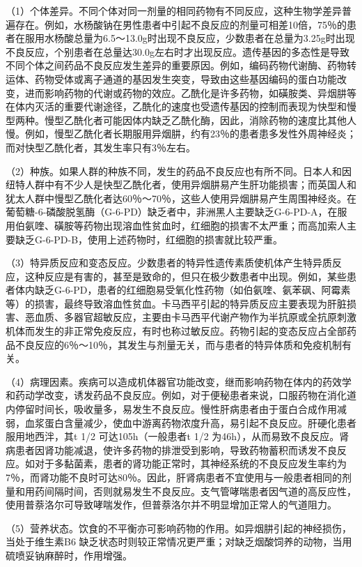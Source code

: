 （1）个体差异。不同个体对同一剂量的相同药物有不同反应，这种生物学差异普遍存在。例如，水杨酸钠在男性患者中引起不良反应的剂量可相差10倍，75％的患者在服用水杨酸总量为6.5～13.0g时出现不良反应，少数患者在总量为3.25g时出现不良反应，个别患者在总量达30.0g左右时才出现反应。遗传基因的多态性是导致不同个体之间药品不良反应发生差异的重要原因。例如，编码药物代谢酶、药物转运体、药物受体或离子通道的基因发生突变，导致由这些基因编码的蛋白功能改变，进而影响药物的代谢或药物的效应。乙酰化是许多药物，如磺胺类、异烟肼等在体内灭活的重要代谢途径，乙酰化的速度也受遗传基因的控制而表现为快型和慢型两种。慢型乙酰化者可能因体内缺乏乙酰化酶，因此，消除药物的速度比其他人慢。例如，慢型乙酰化者长期服用异烟肼，约有23％的患者患多发性外周神经炎；而对快型乙酰化者，其发生率只有3％左右。

（2）种族。如果人群的种族不同，发生的药品不良反应也有所不同。日本人和因纽特人群中有不少人是快型乙酰化者，使用异烟肼易产生肝功能损害；而英国人和犹太人群中慢型乙酰化者达60％～70％，这些人使用异烟肼易产生周围神经炎。在葡萄糖-6-磷酸脱氢酶（G-6-PD）缺乏者中，非洲黑人主要缺乏G-6-PD-A，在服用伯氨喹、磺胺等药物出现溶血性贫血时，红细胞的损害不太严重；而高加索人主要缺乏G-6-PD-B，使用上述药物时，红细胞的损害就比较严重。

（3）特异质反应和变态反应。少数患者的特异性遗传素质使机体产生特异质反应，这种反应是有害的，甚至是致命的，但只在极少数患者中出现。例如，某些患者体内缺乏G-6-PD，患者的红细胞易受氧化性药物（如伯氨喹、氨苯砜、阿霉素等）的损害，最终导致溶血性贫血。卡马西平引起的特异质反应主要表现为肝脏损害、恶血质、多器官超敏反应，主要由卡马西平代谢产物作为半抗原或全抗原刺激机体而发生的非正常免疫反应，有时也称过敏反应。药物引起的变态反应占全部药品不良反应的6％～10％，其发生与剂量无关，而与患者的特异体质和免疫机制有关。

（4）病理因素。疾病可以造成机体器官功能改变，继而影响药物在体内的药效学和药动学改变，诱发药品不良反应。例如，对于便秘患者来说，口服药物在消化道内停留时间长，吸收量多，易发生不良反应。慢性肝病患者由于蛋白合成作用减弱，血浆蛋白含量减少，使血中游离药物浓度升高，易引起不良反应。肝硬化患者服用地西泮，其{t}
{1/2} 可达105h（一般患者{t} {1/2}
为46h），从而易致不良反应。肾病患者因肾功能减退，使许多药物的排泄受到影响，导致药物蓄积而诱发不良反应。如对于多黏菌素，患者的肾功能正常时，其神经系统的不良反应发生率约为7％，而肾功能不良时可达80％。因此，肝肾病患者不宜使用与一般患者相同的剂量和用药间隔时间，否则就易发生不良反应。支气管哮喘患者因气道的高反应性，使用普萘洛尔可导致哮喘发作，但普萘洛尔并不明显增加正常人的气道阻力。

（5）营养状态。饮食的不平衡亦可影响药物的作用。如异烟肼引起的神经损伤，当处于维生素B{6}
缺乏状态时则较正常情况更严重；对缺乏烟酸饲养的动物，当用硫喷妥钠麻醉时，作用增强。

